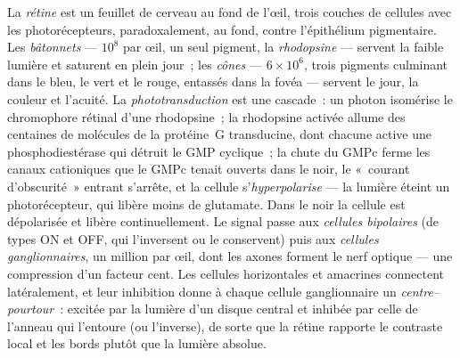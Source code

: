 \begin{definition}[La rétine]\label{def:b3:sensory-systems:retina}
La \emph{rétine} est un feuillet de cerveau au fond de l'œil, trois
couches de cellules avec les photorécepteurs, paradoxalement, au fond,
contre l'épithélium pigmentaire. Les \emph{bâtonnets} --- $10^{8}$ par
œil, un seul pigment, la \emph{rhodopsine} --- servent la faible lumière
et saturent en plein jour~; les \emph{cônes} --- $6\times 10^{6}$, trois
pigments culminant dans le bleu, le vert et le rouge, entassés dans la
fovéa --- servent le jour, la couleur et l'acuité. La
\emph{phototransduction} est une cascade~: un photon isomérise le
chromophore rétinal d'une rhodopsine~; la rhodopsine activée allume des
centaines de molécules de la protéine~G transducine, dont chacune active
une phosphodiestérase qui détruit le GMP cyclique~; la chute du GMPc
ferme les canaux cationiques que le GMPc tenait ouverts dans le noir, le
«~courant d'obscurité~» entrant s'arrête, et la cellule
s'\emph{hyperpolarise} --- la lumière éteint un photorécepteur, qui
libère moins de glutamate. Dans le noir la cellule est dépolarisée et
libère continuellement. Le signal passe aux \emph{cellules bipolaires}
(de types ON et OFF, qui l'inversent ou le conservent) puis aux
\emph{cellules ganglionnaires}, un million par œil, dont les axones
forment le nerf optique --- une compression d'un facteur cent. Les
cellules horizontales et amacrines connectent latéralement, et leur
inhibition donne à chaque cellule ganglionnaire un 
\emph{centre--pourtour}~: excitée par la lumière d'un disque central et
inhibée par celle de l'anneau qui l'entoure (ou l'inverse), de sorte que
la rétine rapporte le contraste local et les bords plutôt que la lumière
absolue.
\end{definition}

